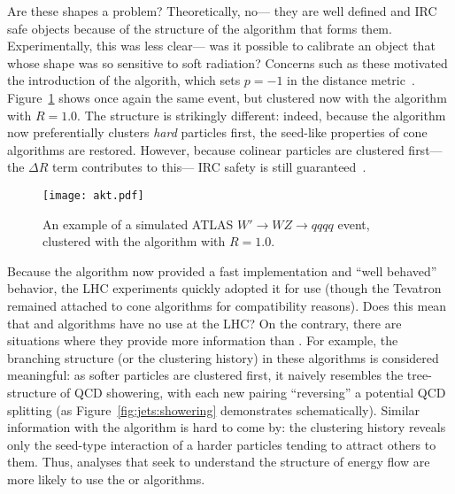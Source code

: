 



Are these shapes a problem? Theoretically, no--- they are well defined and IRC safe objects because of the structure of the algorithm that forms them. Experimentally, this was less clear--- was it possible to calibrate an object that whose shape was so sensitive to soft radiation? Concerns such as these motivated the introduction of the \antikt algorith, which sets $p=-1$ in the distance metric~\cite{Jetography}. Figure~\ref{fig:jets:akt} shows once again the same event, but clustered now with the \antikt algorithm with $R=1.0$. The structure is strikingly different: indeed, because the algorithm now preferentially clusters \textit{hard} particles first, the seed-like properties of cone algorithms are restored. However, because colinear particles are clustered first--- the $\Delta R$ term contributes to this--- IRC safety is still guaranteed~\cite{Jetography}.




\begin{figure}
\centering
\texttt{[image: akt.pdf]}
\label{fig:jets:akt}
\caption{An example of a simulated ATLAS $W'\rightarrow WZ\rightarrow qqqq$ event, clustered with the \antikt algorithm with $R=1.0$.}
\end{figure}


Because the \antikt algorithm now provided a fast implementation and ``well behaved'' behavior, the LHC experiments quickly adopted it for use (though the Tevatron remained attached to cone algorithms for compatibility reasons). Does this mean that \kt and \CA algorithms have no use at the LHC? On the contrary, there are situations where they provide more information than \antikt. For example, the branching structure (or the clustering history) in these algorithms is considered meaningful: as softer particles are clustered first, it naively resembles the tree-structure of QCD showering, with each new pairing ``reversing'' a potential QCD splitting (as Figure~\ref{fig:jets:showering} demonstrates schematically). Similar information with the \antikt algorithm is hard to come by: the clustering history reveals only the seed-type interaction of a harder particles tending to attract others to them. Thus, analyses that seek to understand the structure of energy flow are more likely to use the \kt or \CA algorithms.

